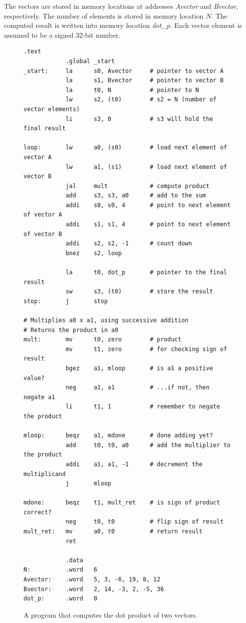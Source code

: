 \documentclass[11pt, twoside, pdftex]{article}
\begin{document}
\noindent
The vectors are stored in memory locations at addresses
{\it Avector} and {\it Bvector}, respectively. The number of elements
is stored in memory location $N$. The computed result is written
into memory location {\it dot\_p}. Each vector element is assumed to be a
signed 32-bit number.

\begin{figure}[H]
\begin{lstlisting}[style=defaultNiosVStyle]
            .text
            .global _start
_start:     la      s0, Avector     # pointer to vector A
            la      s1, Bvector     # pointer to vector B
            la      t0, N           # pointer to N
            lw      s2, (t0)        # s2 = N (number of vector elements)
            li      s3, 0           # s3 will hold the final result
            
loop:       lw      a0, (s0)        # load next element of vector A
            lw      a1, (s1)        # load next element of vector B
            jal     mult            # compute product
            add     s3, s3, a0      # add to the sum
            addi    s0, s0, 4       # point to next element of vector A
            addi    s1, s1, 4       # point to next element of vector B
            addi    s2, s2, -1      # count down
            bnez    s2, loop

            la      t0, dot_p       # pointer to the final result
            sw      s3, (t0)        # store the result
stop:       j       stop

# Multiplies a0 x a1, using successive addition
# Returns the product in a0
mult:       mv      t0, zero        # product
            mv      t1, zero        # for checking sign of result
            bgez    a1, mloop       # is a1 a positive value?
            neg     a1, a1          # ...if not, then negate a1
            li      t1, 1           # remember to negate the product

mloop:      beqz    a1, mdone       # done adding yet?
            add     t0, t0, a0      # add the multiplier to the product
            addi    a1, a1, -1      # decrement the multiplicand
            j       mloop

mdone:      beqz    t1, mult_ret    # is sign of product correct?
            neg     t0, t0          # flip sign of result
mult_ret:   mv      a0, t0          # return result
            ret

            .data
N:          .word   6
Avector:    .word   5, 3, -6, 19, 8, 12
Bvector:    .word   2, 14, -3, 2, -5, 36
dot_p:      .word   0\end{lstlisting}
	\caption{A program that computes the dot product of two vectors.}
	\label{fig:example}
\end{figure}
 
\end{document}
